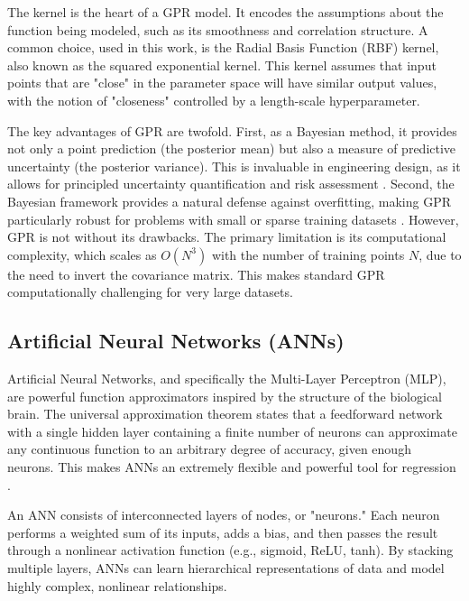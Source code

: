 \documentclass[dsc, EN]{ufabcFHZh}
\begin{document}
The kernel is the heart of a GPR model. It encodes the assumptions about the function being modeled, such as its smoothness and correlation structure. A common choice, used in this work, is the Radial Basis Function (RBF) kernel, also known as the squared exponential kernel. This kernel assumes that input points that are "close" in the parameter space will have similar output values, with the notion of "closeness" controlled by a length-scale hyperparameter.

The key advantages of GPR are twofold. First, as a Bayesian method, it provides not only a point prediction (the posterior mean) but also a measure of predictive uncertainty (the posterior variance). This is invaluable in engineering design, as it allows for principled uncertainty quantification and risk assessment \citep{wang2007review}. Second, the Bayesian framework provides a natural defense against overfitting, making GPR particularly robust for problems with small or sparse training datasets \citep{anonymous2022gaussian}. However, GPR is not without its drawbacks. The primary limitation is its computational complexity, which scales as $O(N^3)$ with the number of training points $N$, due to the need to invert the covariance matrix. This makes standard GPR computationally challenging for very large datasets.

\subsection{Artificial Neural Networks (ANNs)}

Artificial Neural Networks, and specifically the Multi-Layer Perceptron (MLP), are powerful function approximators inspired by the structure of the biological brain. The universal approximation theorem states that a feedforward network with a single hidden layer containing a finite number of neurons can approximate any continuous function to an arbitrary degree of accuracy, given enough neurons. This makes ANNs an extremely flexible and powerful tool for regression \citep{mifsud2016reduced}.

An ANN consists of interconnected layers of nodes, or "neurons." Each neuron performs a weighted sum of its inputs, adds a bias, and then passes the result through a nonlinear activation function (e.g., sigmoid, ReLU, tanh). By stacking multiple layers, ANNs can learn hierarchical representations of data and model highly complex, nonlinear relationships.
\end{document}
